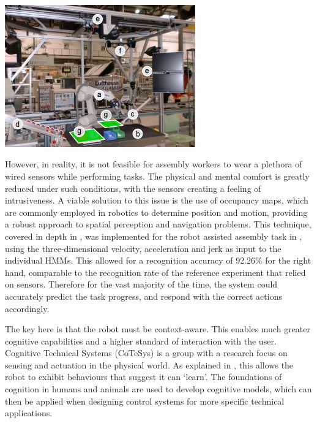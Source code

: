 \documentclass[11pt]{article}
\begin{document}
\begin{center}
\includegraphics[width = 0.62\textwidth]{jahir.png}
\label{figure:jahir}
\end{center}

However, in reality, it is not feasible for assembly workers to wear a plethora of wired sensors while performing tasks. The physical and mental comfort is greatly reduced under such conditions, with the sensors creating a feeling of intrusiveness. A viable solution to this issue is the use of occupancy maps, which are commonly employed in robotics to determine position and motion, providing a robust approach to spatial perception and navigation problems. This technique, covered in depth in \cite{elfes1989}, was implemented for the robot assisted assembly task in \cite{lenz2011}, using the three-dimensional velocity, acceleration and jerk as input to the individual HMMs. This allowed for a recognition accuracy of 92.26\% for the right hand, comparable to the recognition rate of the reference experiment that relied on sensors. Therefore for the vast majority of the time, the system could accurately predict the task progress, and respond with the correct actions accordingly.


The key here is that the robot must be context-aware. This enables much greater cognitive capabilities and a higher standard of interaction with the user. Cognitive Technical Systems (CoTeSys) is a group with a research focus on sensing and actuation in the physical world. As explained in \cite{buss2010}, this allows the robot to exhibit behaviours that suggest it can `learn'. The foundations of cognition in humans and animals are used to develop cognitive models, which can then be applied when designing control systems for more specific technical applications. 
\end{document}
